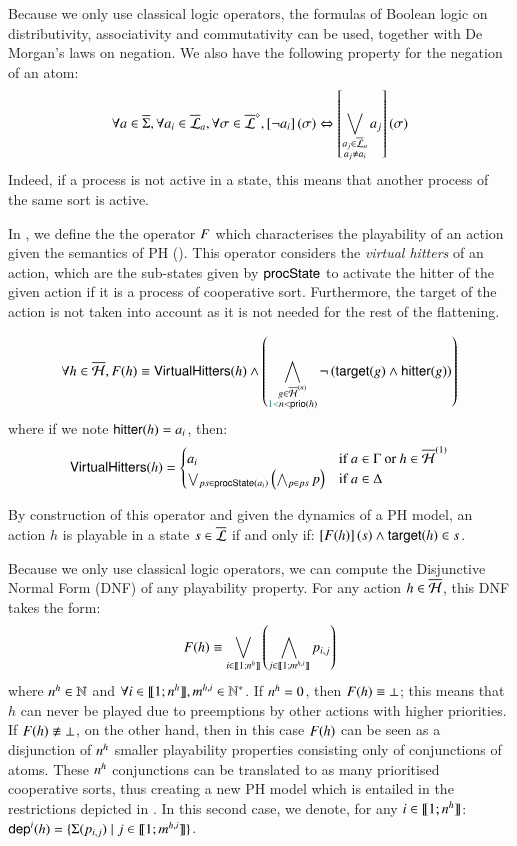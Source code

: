 Because we only use classical logic operators, the formulas of Boolean logic on 
distributivity, associativity and commutativity can be used, together with De Morgan's laws on negation.
We also have the following property for the negation of an atom:
\[\forall a \in \overline{\Sigma}, \forall a_i \in \overline{\mathcal{L}}_a, \forall \sigma \in \overline{\mathcal{L}}^\diamond,
  \left[\neg a_i\right](\sigma) \Leftrightarrow \left[\bigvee_{\substack{a_j \in \overline{\mathcal{L}}_a\\a_j \neq a_i}} a_j\right](\sigma)\]
Indeed, if a process is not active in a state, this means that another process of the same sort is active.

In , we define the the operator $F$ which characterises the playability of an action
given the semantics of PH ().
This operator considers the \emph{virtual hitters} of an action,
which are the sub-states given by $\mathsf{procState}$ to activate the hitter of the given action if it is a process of cooperative sort.
Furthermore, the target of the action is not taken into account as it is not needed for the rest of the flattening.
%
\begin{definition}\label{def:fop}
  \[\forall h \in \overline{\mathcal{H}}, F(h) \equiv \mathsf{VirtualHitters}(h) \wedge
    \left( \bigwedge_{\substack{g \in \overline{\mathcal{H}}^{(n)}\\\textcolor{teal}{1 <} n < \mathsf{prio}(h)}}
    \neg \left( \mathsf{target}(g) \wedge \mathsf{hitter}(g)\right) \right)\]
  where if we note $\mathsf{hitter}(h) = a_i$, then:
  \[\mathsf{VirtualHitters}(h) =
    \begin{cases}
      a_i & \text{if } a \in \Gamma \text{ or } h \in \overline{\mathcal{H}}^{(1)} \\
      \bigvee_{ps \in \mathsf{procState}(a_i)} \left( \bigwedge_{p \in ps} p \right) & \text{if } a \in \Delta
    \end{cases}\]
\end{definition}
%
By construction of this operator and given the dynamics of a PH model,
an action $h$ is playable in a state $s \in \overline{\mathcal{L}}$ if and only if: $\left[F(h)\right](s) \wedge \mathsf{target}(h) \in s$.

Because we only use classical logic operators, we can compute the Disjunctive Normal Form (DNF) of any playability property.
For any action $h \in \overline{\mathcal{H}}$, this DNF takes the form:
\[F(h) \equiv \bigvee_{i \in \llbracket 1; n^{h} \rrbracket} \left( \bigwedge_{j \in \llbracket 1; m^{h,i} \rrbracket} p_{i,j} \right)\]
where $n^{h} \in \mathbb{N}$ and $\forall i \in \llbracket 1; n^{h} \rrbracket, m^{h,i} \in \mathbb{N}^*$.
If $n^{h} = 0$, then $F(h) \equiv \bot$; this means that $h$ can never be played
due to preemptions by other actions with higher priorities.
If $F(h) \not\equiv \bot$, on the other hand, then in this case $F(h)$
can be seen as a disjunction of $n^{h}$ smaller playability properties consisting only of conjunctions of atoms.
These $n^{h}$ conjunctions can be translated to as many prioritised cooperative sorts,
thus creating a new PH model which is entailed in the restrictions depicted in .
In this second case, we denote, for any $i \in \llbracket 1; n^{h} \rrbracket$:
$\mathsf{dep}^{i}(h) = \{ \Sigma(p_{i,j}) \mid j \in \llbracket 1; m^{h,i} \rrbracket \}$.

